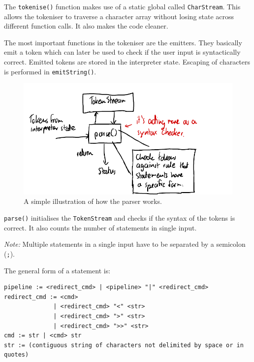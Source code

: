 \documentclass[12pt]{article}
\begin{document}


The \texttt{tokenise()} function makes use of a static global
called \texttt{CharStream}. This allows the tokeniser to
traverse a character array without losing state across different
function calls. It also makes the code cleaner.

\newpage



The most important functions in the tokeniser are the emitters.
They basically emit a token which can later be used to check if
the user input is syntactically correct. Emitted tokens are
stored in the interpreter state. Escaping of characters is
performed in \texttt{emitString()}.

\begin{figure}[H]
\centering
\includegraphics{parser}
\caption{A simple illustration of how the parser works.}
\end{figure}

\newpage



\texttt{parse()} initialises the \texttt{TokenStream} and checks
if the syntax of the tokens is correct. It also counts the
number of statements in single input.

\textit{Note:} Multiple statements in a single input have to
be separated by a semicolon (\texttt{;}).

The general form of a statement is:

\begin{verbatim}
pipeline := <redirect_cmd> | <pipeline> "|" <redirect_cmd>
redirect_cmd := <cmd>
              | <redirect_cmd> "<" <str>
              | <redirect_cmd> ">" <str>
              | <redirect_cmd> ">>" <str> 
cmd := str | <cmd> str
str := (contiguous string of characters not delimited by space or in quotes)
\end{verbatim}
\end{document}
